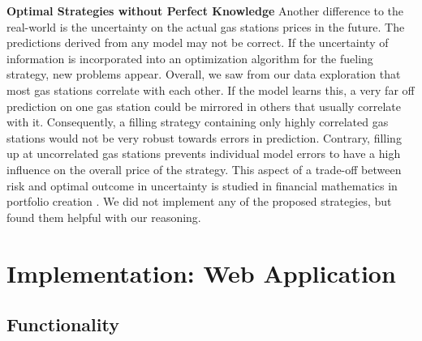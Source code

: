 \documentclass[%
a4paper,
DIV12,
2.5headlines,
bigheadings,
titlepage,
openbib,
]{scrartcl}
\begin{document}
\textbf{Optimal Strategies without Perfect Knowledge}
Another difference to the real-world is the uncertainty on the actual gas stations prices in the future.
The predictions derived from any model may not be correct.
If the uncertainty of information is incorporated into an optimization algorithm for the fueling strategy, new problems appear.
Overall, we saw from our data exploration that most gas stations correlate with each other.
If the model learns this, a very far off prediction on one gas station could be mirrored in others that usually correlate with it.
Consequently, a filling strategy containing only highly correlated gas stations would not be very robust towards errors in prediction.
Contrary, filling up at uncorrelated gas stations prevents individual model errors to have a high influence on the overall price of the strategy.
This aspect of a trade-off between risk and optimal outcome in uncertainty is studied in financial mathematics in portfolio creation \citep{markowitz1952portfolio}.
We did not implement any of the proposed strategies, but found them helpful with our reasoning. 

\section{Implementation: Web Application}\label{implemented-application}

\subsection{Functionality}\label{functionality}

\end{document}
